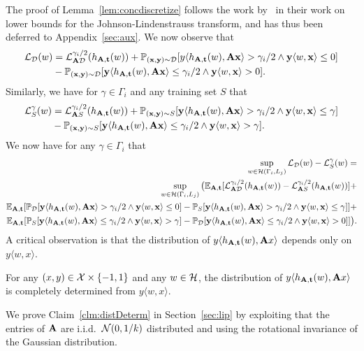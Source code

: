 The proof of Lemma~\ref{lem:concdiscretize} follows the work by~\cite{AK17} in their work on lower bounds for the Johnson-Lindenstrauss transform, and has thus been deferred to Appendix~\ref{sec:aux}. We now observe that
\begin{align*}
    \mathcal{L}_{\mathcal{D}}(w) &= \mathcal{L}^{\gamma_i/2}_{\mathbf{A} \mathcal{D}}(h_{\mathbf{A},\mathbf{t}}(w)) + \mathbb{P}_{(\mathbf{x},\mathbf{y}) \sim \mathcal{D}}[y \langle h_{\mathbf{A},\mathbf{t}}(w), \mathbf{A} \mathbf{x}\rangle > \gamma_i/2 \wedge \mathbf{y} \langle w, \mathbf{x}\rangle \leq 0] \\
    &- \mathbb{P}_{(\mathbf{x},\mathbf{y}) \sim \mathcal{D}}[\mathbf{y} \langle h_{\mathbf{A},\mathbf{t}}(w), \mathbf{A} \mathbf{x}\rangle \leq \gamma_i/2 \wedge \mathbf{y} \langle w, \mathbf{x}\rangle > 0].
\end{align*}
Similarly, we have for $\gamma \in \Gamma_i$ and any training set $S$ that
\begin{align*}
    \mathcal{L}_{S}^\gamma(w) &= \mathcal{L}^{\gamma_i/2}_{\mathbf{A} S}(h_{\mathbf{A},\mathbf{t}}(w)) + \mathbb{P}_{(\mathbf{x},\mathbf{y}) \sim S}[\mathbf{y} \langle h_{\mathbf{A},\mathbf{t}}(w), \mathbf{A} \mathbf{x}\rangle > \gamma_i/2 \wedge \mathbf{y} \langle w, \mathbf{x}\rangle \leq \gamma] \\
    &- \mathbb{P}_{(\mathbf{x},\mathbf{y}) \sim S}[\mathbf{y} \langle h_{\mathbf{A},\mathbf{t}}(w), \mathbf{A}\mathbf{x}\rangle \leq \gamma_i/2 \wedge \mathbf{y} \langle w, \mathbf{x}\rangle > \gamma].
\end{align*}
We now have for any $\gamma \in \Gamma_i$ that
\begin{align}
\sup_{w \in \mathcal{H}(\Gamma_i,L_j)} \mathcal{L}_{\mathcal{D}}(w) - \mathcal{L}^\gamma_S(w) =& \nonumber \\ 
\sup_{w \in \mathcal{H}(\Gamma_i,L_j)} \big(\mathbb{E}_{\mathbf{A},\mathbf{t}} [\mathcal{L}^{\gamma_i/2}_{\mathbf{A} \mathcal{D}}(h_{\mathbf{A},\mathbf{t}}(w)) - \mathcal{L}^{\gamma_i/2}_{\mathbf{A} S}(h_{\mathbf{A},\mathbf{t}}(w))] +& \nonumber\\ \mathbb{E}_{\mathbf{A},\mathbf{t}} [\mathbb{P}_{\mathcal{D}}[\mathbf{y} \langle h_{\mathbf{A},\mathbf{t}}(w), \mathbf{A} \mathbf{x}\rangle > \gamma_i/2 \wedge \mathbf{y} \langle w, \mathbf{x}\rangle \leq 0] -\mathbb{P}_{S}[\mathbf{y} \langle h_{\mathbf{A},\mathbf{t}}(w), \mathbf{A} \mathbf{x}\rangle > \gamma_i/2 \wedge \mathbf{y} \langle w, \mathbf{x}\rangle \leq \gamma] ] +& \nonumber\\
\mathbb{E}_{\mathbf{A},\mathbf{t}} [\mathbb{P}_{S}[\mathbf{y} \langle h_{\mathbf{A},\mathbf{t}}(w), \mathbf{A} \mathbf{x}\rangle \leq \gamma_i/2 \wedge \mathbf{y} \langle w, \mathbf{x}\rangle > \gamma] -\mathbb{P}_{\mathcal{D}}[\mathbf{y} \langle h_{\mathbf{A},\mathbf{t}}(w), \mathbf{A} \mathbf{x}\rangle \leq \gamma_i/2 \wedge \mathbf{y} \langle w, \mathbf{x}\rangle > 0] ]\big).\label{eq:3terms}
\end{align}
A critical observation is that the distribution of $y \langle h_{\mathbf{A},\mathbf{t}}(w),\mathbf{A} x \rangle$ depends only on $y \langle w, x \rangle$. 
\begin{claim}
\label{clm:distDeterm}
For any $(x,y) \in \mathcal{X} \times \{-1,1\}$ and any $w \in \mathcal{H}$, the distribution of $y \langle h_{\mathbf{A},\mathbf{t}}(w),\mathbf{A} x \rangle$ is completely determined from $y \langle w, x \rangle$.
\end{claim}
We prove Claim~\ref{clm:distDeterm} in Section~\ref{sec:lip} by exploiting that the entries of $\mathbf{A}$ are i.i.d.\ $\mathcal{N}(0,1/k)$ distributed and using the rotational invariance of the Gaussian distribution.

